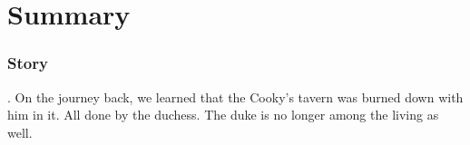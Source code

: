 \part*{Summary}
\section{Story}
. On the journey back, we learned that the Cooky's tavern was burned down with him in it.
All done by the duchess. The duke is no longer among the living as well.
